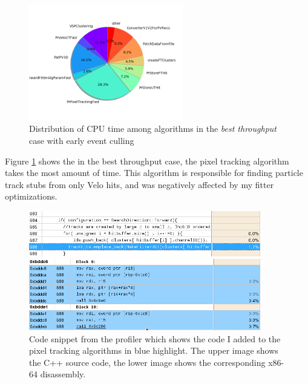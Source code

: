 \documentclass[12pt]{article}
\begin{document}
\begin{figure}[H]
	\begin{center}
		\includegraphics[width=0.6\textwidth]{algo_usage_original_bestthru}
	\end{center}
	\caption{Distribution of CPU time among algorithms in the \textit{best throughput} case with early event culling}
	\label{fig_algo_usage_original_bestthru}
\end{figure}


Figure \ref{fig_algo_usage_original_bestthru} shows the in the best throughput case, the pixel tracking algorithm takes the most amount of time. This algorithm is responsible for finding particle track stubs from only Velo hits, and was negatively affected by my fitter optimizations.


\begin{figure}[H]
	\begin{center}
		\includegraphics[width=0.9\textwidth]{kalmanfit_disasm_opt_src_naive}
	\end{center}
	\begin{center}
		\includegraphics[width=0.9\textwidth]{kalmanfit_disasm_opt_asm_naive}
	\end{center}
	\caption{Code snippet from the profiler which shows the code I added to the pixel tracking algorithms in blue highlight. The upper image shows the C++ source code, the lower image shows the corresponding x86-64 disassembly.}
	\label{fig_kalman_disasm_src_naive}
\end{figure}
\end{document}
